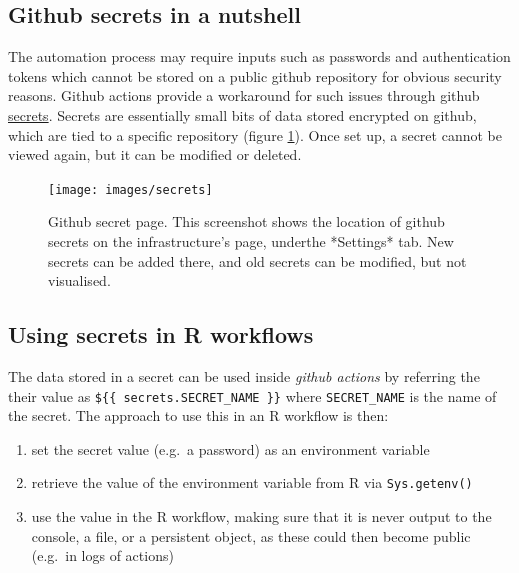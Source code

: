 \documentclass[]{book}
\providecommand{\tightlist}{%
  \setlength{\itemsep}{0pt}\setlength{\parskip}{0pt}}
\begin{document}
\hypertarget{github-secrets-in-a-nutshell}{%
\subsection{Github secrets in a nutshell}\label{github-secrets-in-a-nutshell}}

The automation process may require inputs such as passwords and authentication
tokens which cannot be stored on a public github repository for obvious security
reasons. Github actions provide a workaround for such issues through github
\href{https://docs.github.com/en/actions/reference/encrypted-secrets}{secrets}. Secrets
are essentially small bits of data stored encrypted on github, which are tied to
a specific repository (figure \ref{fig:secrets}). Once set up, a secret cannot
be viewed again, but it can be modified or deleted.

\begin{figure}

{\centering \texttt{[image: images/secrets]} 

}

\caption{Github secret page. This screenshot shows the location of github secrets on the infrastructure's page, underthe *Settings* tab. New secrets can be added there, and old secrets can be modified, but not visualised.}\label{fig:secrets}
\end{figure}

\hypertarget{using-secrets-in-r-workflows}{%
\subsection{Using secrets in R workflows}\label{using-secrets-in-r-workflows}}

The data stored in a secret can be used inside \emph{github actions} by referring the
their value as \texttt{\$\{\{\ secrets.SECRET\_NAME\ \}\}} where \texttt{SECRET\_NAME} is the name of
the secret. The approach to use this in an R workflow is then:

\begin{enumerate}
\def\labelenumi{\arabic{enumi}.}
\tightlist
\item
  set the secret value (e.g.~a password) as an environment variable
\item
  retrieve the value of the environment variable from R via \texttt{Sys.getenv()}
\item
  use the value in the R workflow, making sure that it is never output to the
  console, a file, or a persistent object, as these could then become public
  (e.g.~in logs of actions)
\end{enumerate}
\end{document}
